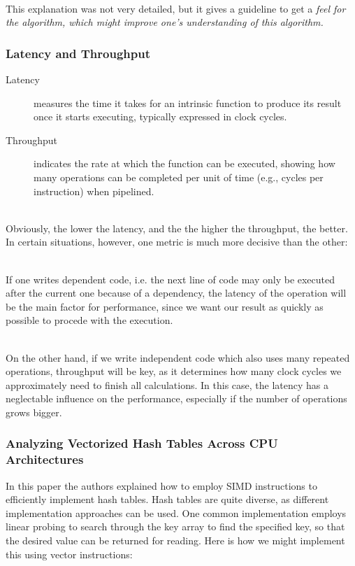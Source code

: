 \documentclass[../../main.tex]{subfiles}
\begin{document}
~\\
This explanation was not very detailed, but it gives a guideline to get a \em feel \em for the algorithm, which might improve one's understanding of this algorithm.


\bigskip
\subsubsection{Latency and Throughput}
\begin{description}
    \item[Latency] measures the time it takes for an intrinsic function to produce its result once it starts executing, typically expressed in clock cycles.
    \item[Throughput] indicates the rate at which the function can be executed, showing how many operations can be completed per unit of time (e.g., cycles per instruction) when pipelined.
\end{description}

~\\
Obviously, the lower the latency, and the the higher the throughput, the better. In certain situations, however, one metric is much more decisive than the other:

~\\
If one writes dependent code, i.e. the next line of code may only be executed after the current one because of a dependency, the latency of the operation will be the main factor for performance, since we want our result as quickly as possible to procede with the execution.

~\\
On the other hand, if we write independent code which also uses many repeated operations, throughput will be key, as it determines how many clock cycles we approximately need to finish all calculations.
In this case, the latency has a neglectable influence on the performance, especially if the number of operations grows bigger.

\bigskip
\subsubsection{Analyzing Vectorized Hash Tables Across CPU Architectures}
In this paper the authors explained how to employ SIMD instructions to efficiently implement hash tables. Hash tables are quite diverse, as different implementation approaches can be used. One common implementation employs linear probing to search through the key array to find the specified key, so that the desired value can be returned for reading. Here is how we might implement this using vector instructions:
\end{document}
